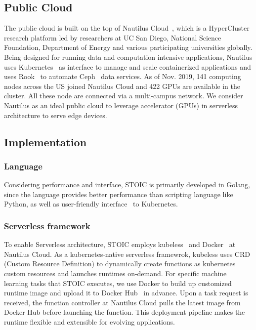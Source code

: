  \subsection{Public Cloud}
 
 The public cloud is built on the top of Nautilus Cloud~\cite{ref:nautilus}, which is a HyperCluster research platform led by researchers at UC San Diego, National Science Foundation, Department of Energy and various participating universities globally. Being designed for running data and computation intensive applications, Nautilus uses Kubernetes~\cite{ref:k8s} as interface to manage and scale containerized applications and uses Rook~\cite{ref:rook} to automate Ceph~\cite{ref:ceph} data services. As of Nov. 2019, 141 computing nodes across the US joined Nautilus Cloud and 422 GPUs are available in the cluster. All these node are connected via a multi-campus network. We consider Nautilus as an ideal public cloud to leverage accelerator (GPUs) in serverless architecture to serve edge devices. 
 
 \subsection{Implementation}
 
 \subsubsection{Language}
 Considering performance and interface, STOIC is primarily developed in Golang, since the language provides better performance than scripting language like Python, as well as user-friendly interface~\cite{ref:client-go} to Kubernetes. 
 
 \BlankLine
 \subsubsection{Serverless framework}
 To enable Serverless architecture, STOIC employs kubeless~\cite{ref:kubeless} and Docker~\cite{ref:docker} at Nautilus Cloud. As a kubernetes-native serverless framewrok, kubeless uses CRD (Custom Resource Definition)\cite{ref:crd} to dynamically create functions as kubernetes custom resources and launches runtimes on-demand. For specific machine learning tasks that STOIC executes, we use Docker to build up customized runtime image and upload it to Docker Hub~\cite{ref:dockerhub} in advance. Upon a task request is received, the function controller at Nautilus Cloud pulls the latest image from Docker Hub before launching the function. This deployment pipeline makes the runtime flexible and extensible for evolving applications. 
 
